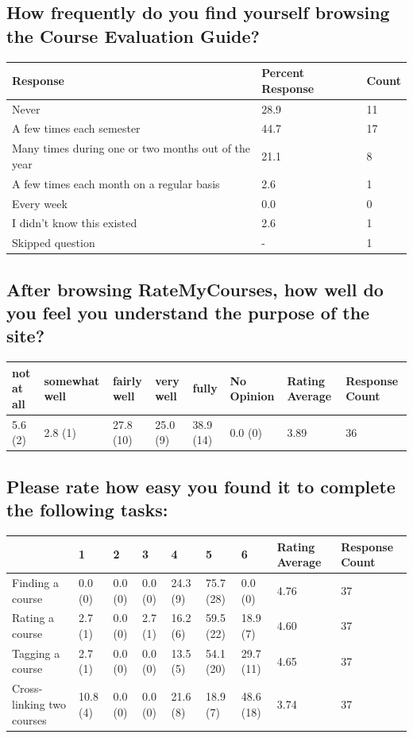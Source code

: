 \documentclass[12pt]{report}
\begin{document}
\subsection*{How frequently do you find yourself browsing the Course Evaluation Guide?}

\begin{tabular}{p{8cm}ll}
Response	&Percent Response	&Count \\
\hline
Never	&28.9	&11\\
A few times each semester	&44.7	&17\\
Many times during one or two months out of the 	year	&21.1	&8\\
A few times each month on a regular basis	&2.6	&1\\
Every week	&0.0	&0\\
I didn't know this existed	&2.6	&1\\
Skipped question	&-	&1\\
\end{tabular}

\subsection*{After browsing RateMyCourses, how well do you feel you understand the purpose of the site?}

\resizebox{15cm}{!} {
\begin{tabular}{llllllll}
not at all	&somewhat well	&fairly well	&very well	&fully	&No Opinion	&Rating Average	&Response Count\\
\hline
5.6 (2)	&2.8 (1)	&27.8 (10)	&25.0 (9)	&38.9 (14)	&0.0 (0)	&3.89	&36\\
\end{tabular}
}

\subsection*{Please rate how easy you found it to complete the following tasks:}

\resizebox{15cm}{!} {
\begin{tabular}{lllllllll}
	&1	&2	&3	&4	&5	&6	&Rating Average	&Response Count\\
\hline
Finding a course	&0.0 (0)	&0.0 (0)	&0.0 (0)	&24.3 (9)	&75.7 (28)	&0.0 (0)	&4.76	&37\\
Rating a course	&2.7 (1)	&0.0 (0)	&2.7 (1)	&16.2 (6)	&59.5 (22)	&18.9 (7)	&4.60	&37\\
Tagging a course	&2.7 (1)	&0.0 (0)	&0.0 (0)	&13.5 (5)	&54.1 (20)	&29.7 (11)	&4.65	&37\\
Cross-linking two courses	&10.8 (4)	&0.0 (0)	&0.0 (0)	&21.6 (8)	&18.9 (7)	&48.6 (18)	&3.74	&37\\
\end{tabular}
}
\end{document}
